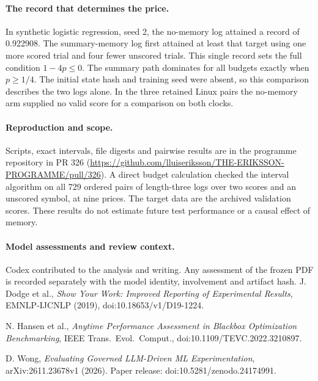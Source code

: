 \documentclass[11pt]{article}
\begin{document}
\paragraph{The record that determines the price.} In synthetic logistic regression, seed 2, the no-memory log attained a record of 0.922908. The summary-memory log first attained at least that target using one more scored trial and four fewer unscored trials. This single record sets the full condition $1-4p\le0$. The summary path dominates for all budgets exactly when $p\ge1/4$. The initial state hash and training seed were absent, so this comparison describes the two logs alone. In the three retained Linux pairs the no-memory arm supplied no valid score for a comparison on both clocks.

\paragraph{Reproduction and scope.} Scripts, exact intervals, file digests and pairwise results are in the programme repository in PR 326 (\url{https://github.com/lluiseriksson/THE-ERIKSSON-PROGRAMME/pull/326}). A direct budget calculation checked the interval algorithm on all 729 ordered pairs of length-three logs over two scores and an unscored symbol, at nine prices. The target data are the archived validation scores. These results do not estimate future test performance or a causal effect of memory.
\paragraph{Model assessments and review context.} Codex contributed to the analysis and writing. Any assessment of the frozen PDF is recorded separately with the model identity, involvement and artifact hash.
\small
\noindent [1] J. Dodge et al., \emph{Show Your Work: Improved Reporting of Experimental Results}, EMNLP-IJCNLP (2019), doi:10.18653/v1/D19-1224.\par\noindent [2] N. Hansen et al., \emph{Anytime Performance Assessment in Blackbox Optimization Benchmarking}, IEEE Trans.\ Evol.\ Comput., doi:10.1109/TEVC.2022.3210897.\par\noindent [3] D. Wong, \emph{Evaluating Governed LLM-Driven ML Experimentation}, arXiv:2611.23678v1 (2026). Paper release: doi:10.5281/zenodo.24174991.
\end{document}
